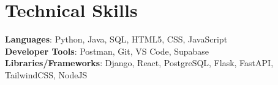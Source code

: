 \documentclass[letterpaper,11pt]{article}
\begin{document}
\section{Technical Skills}
 \begin{itemize}[leftmargin=0.15in, label={}]
    \small{\item{   
     \textbf{Languages}{: Python, Java, SQL, HTML5, CSS, JavaScript} \\[1mm]
     \textbf{Developer Tools}{: Postman, Git, VS Code, Supabase} \\[1mm]
     \textbf{Libraries/Frameworks}{: Django, React, PostgreSQL, Flask, FastAPI, TailwindCSS, NodeJS} \\ [1mm]
    }}
 \end{itemize}
 \vspace{-16pt}
 \vspace{3pt}
\vspace{10pt}

\vspace{-15pt}
\end{document}

